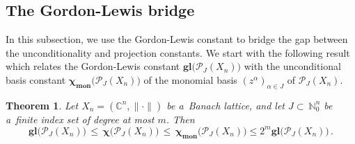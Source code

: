 \documentclass[12pt]{amsart}
\numberwithin{subsection}{section}
\newtheorem{theorem}{Theorem}[section]
\theoremstyle{definition}
\theoremstyle{remark}
\DeclareMathOperator{\mon}{mon}
\newcommand{\chimon}{\chi_{\mon}}
\begin{document}





\subsection{The Gordon-Lewis bridge}

In this subsection, we use the Gordon-Lewis constant to bridge the gap between the unconditionality and projection constants.
We start with the following result which relates the Gordon-Lewis constant ${\boldsymbol{g\!l}}\big(\mathcal{P}_{J}(X_n)\big)$
with the unconditional basis constant $\boldsymbol{\chimon}\big( \mathcal{P}_{J}(X_n) \big)$ of the monomial basis
$(z^\alpha)_{\alpha \in J}$ of $\mathcal{P}_{J}(X_n)$.

\begin{theorem} \label{gl-versus-unc}
Let $X_n = (\mathbb{C}^n,\|\cdot\|)$  be a~Banach  lattice, and  let $J\subset~\mathbb{N}_0^n$ be a~finite index
set of degree at most $m$. Then
\[
\boldsymbol{g\!l}\big( \mathcal{P}_{J}(X_n)\big) \,\leq\,\boldsymbol{\chi}\big(\mathcal{P}_{J}(X_n) \big)
\,\leq\, \boldsymbol{\chimon}\big( \mathcal{P}_{J}(X_n) \big) \le 2^m \boldsymbol{g\!l}\big( \mathcal{P}_{J}(X_n) \big)\,.
\]
\end{theorem}
\end{document}
